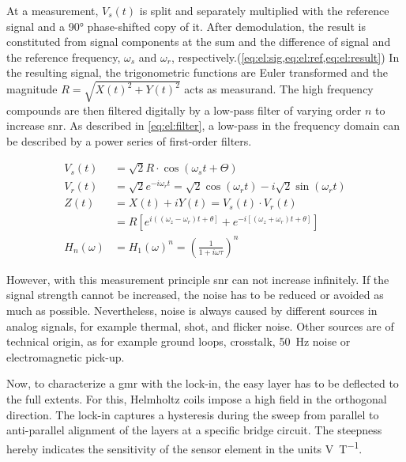 At a measurement, $V_s(t)$ is split and separately multiplied with the reference signal and a \ang{90} phase-shifted copy of it. After demodulation, the result is constituted from signal components at the sum and the difference of signal and the reference frequency, $\omega_{s}$ and $\omega_{r}$, respectively.(\cref{eq:el:sig,eq:el:ref,eq:el:result}) In the resulting signal, the trigonometric functions are Euler transformed and the magnitude $R=\sqrt{X(t)^2+Y(t)^2}$ acts as measurand. The high frequency compounds are then filtered digitally by a low-pass filter of varying order $n$ to increase \gls{snr}. As described in \cref{eq:el:filter}, a low-pass in the frequency domain can be described by a power series of first-order filters.

\begin{align}
		V_{s}(t) &=\sqrt{2} R \cdot \cos \left(\omega_{s} t+\Theta\right) \label{eq:el:sig} \\
	V_{r}(t)&=\sqrt{2} e^{-i \omega_{r} t}=\sqrt{2} \cos \left(\omega_{r} t\right)-i \sqrt{2} \sin \left(\omega_{r} t\right) \label{eq:el:ref}\\
	Z(t) &=X(t)+i Y(t)=V_{s}(t) \cdot V_{r}(t) \label{eq:el:result} \\
		&=R\left[e^{i\left(\left(\omega_{z}-\omega_{r}\right) t+\theta\right]}+e^{-i\left[\left(\omega_{z}+\omega_{r}\right) t+\theta\right]}\right] \\
		H_{n}(\omega)&=H_{1}(\omega)^{n}=\left(\frac{1}{1+i \omega \tau}\right)^{n} \label{eq:el:filter}
\end{align}


However, with this measurement principle \gls{snr} can not increase infinitely. If the signal strength cannot be increased, the noise  has to be reduced or avoided as much as possible. Nevertheless, noise is always caused by different sources in analog signals, for example thermal, shot, and flicker noise. Other sources are of technical origin, as for example ground loops, crosstalk, \SI{50}{\hertz} noise or electromagnetic pick-up. \cite{lit:nano:lockin}

Now, to characterize a \gls{gmr} with the lock-in, the easy layer has to be deflected to the full extents. For this, Helmholtz coils impose a high field in the orthogonal direction. The lock-in captures a hysteresis during the sweep from parallel to anti-parallel alignment of the layers at a specific bridge circuit. The steepness hereby indicates the sensitivity of the sensor element in the units \si{\volt\per\tesla}.



